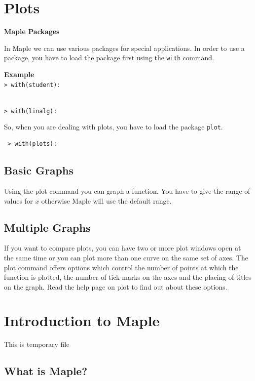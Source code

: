 \documentclass[
]{book}
\theoremstyle{definition}
\theoremstyle{definition}
\theoremstyle{definition}
\theoremstyle{definition}
\theoremstyle{remark}
\begin{document}
\chapter{Plots}\label{plots}

\textbf{Maple Packages}

In Maple we can use various packages for special applications. In order to use a package, you have to load the package first using the \texttt{with} command.

\textbf{Example}\\
\texttt{\textgreater{}\ with(student):}\strut \\
\texttt{\textgreater{}\ with(linalg):}

So, when you are dealing with plots, you have to load the package \texttt{plot}.

\begin{verbatim}
 > with(plots):
\end{verbatim}

\section{Basic Graphs}\label{basic-graphs}

Using the plot command you can graph a function. You have to give the range of values for \(x\) otherwise Maple will use the default range.

\section{Multiple Graphs}\label{multiple-graphs}

If you want to compare plots, you can have two or more plot windows open at the same time or you can plot more than one curve on the same set of axes. The plot command offers options which control the number of points at which the function is plotted, the number of
tick marks on the axes and the placing of titles on the graph. Read the help page on plot to find out about these options.

\chapter{Introduction to Maple}\label{introduction-to-maple-1}

This is temporary file

\section{What is Maple?}\label{what-is-maple-1}
\end{document}

